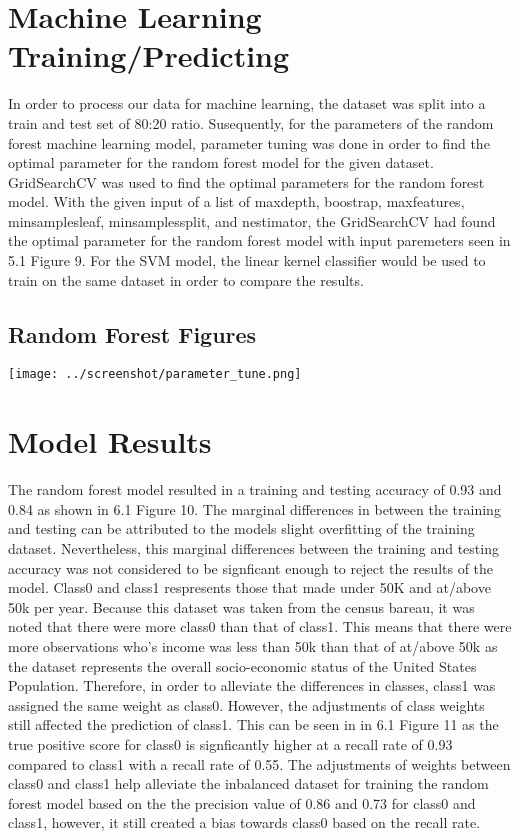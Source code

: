 \documentclass[12pt]{article}
\begin{document}
\begin{multicols*}{2}
\section{Machine Learning Training/Predicting}
  \hspace*{5mm} In order to process our data for machine learning, the dataset was split into a train and test set of 80:20 ratio. Susequently, for the parameters of the random forest machine learning model,
  parameter tuning was done in order to find the optimal parameter for the random forest model for the given dataset. GridSearchCV was used to find the optimal parameters for the random forest model. With the given input of a list of
  maxdepth, boostrap, maxfeatures, minsamplesleaf, minsamplessplit, and nestimator, the GridSearchCV had found the optimal parameter for the random forest model with input paremeters seen in 5.1 Figure 9. For the SVM model,
  the linear kernel classifier would be used to train on the same dataset in order to compare the results. 
  \subsection{Random Forest Figures}
  \begin{center}
	\texttt{[image: ../screenshot/parameter\_tune.png]}	
  \end{center}


  \section{Model Results}
  \hspace*{5mm} The random forest model resulted in a training and testing accuracy of 0.93 and 0.84 as shown in 6.1 Figure 10. The marginal differences in between the training and testing can be attributed to the models slight overfitting
  of the training dataset. Nevertheless, this marginal differences between the training and testing accuracy was not considered to be signficant enough to reject the results of the model. Class0 and class1 respresents
  those that made under 50K and at/above 50k per year. Because this dataset was taken from the census bareau, it was noted that there were more class0 than that of class1. This means that there were more observations who's income was less than 50k than that of at/above
  50k as the dataset represents the overall socio-economic status of the United States Population. Therefore, in order to alleviate the differences in classes, class1 was assigned the same weight as class0. 
  However, the adjustments of class weights still affected the prediction of class1. This can be seen in in 6.1 Figure 11 as the true positive score for class0 is signficantly higher at a recall rate of 0.93 compared to class1 with a recall rate
  of 0.55. The adjustments of weights between class0 and class1 help alleviate the inbalanced dataset for training the random forest model based on the the precision value of 0.86 and 0.73 for class0 and class1, however,
	it still created a bias towards class0 based on the recall rate.



\end{multicols*}
\end{document}
